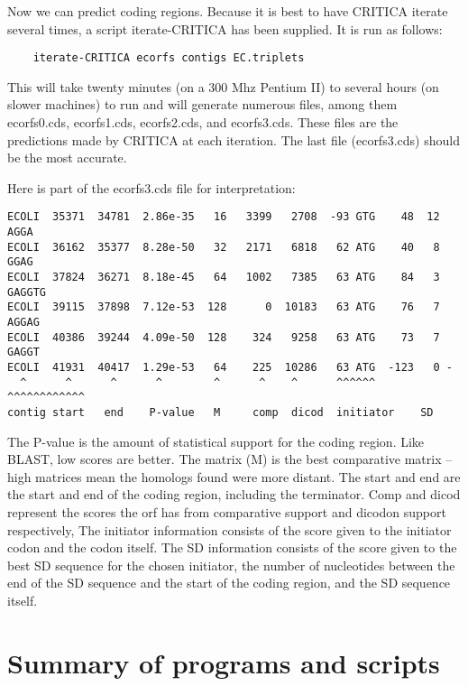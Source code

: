 \documentclass{article}
\begin{document}
Now we can predict coding regions. Because it is best to have CRITICA
iterate several times, a script iterate-CRITICA has been
supplied. It is run as follows:

\begin{verbatim}
	iterate-CRITICA ecorfs contigs EC.triplets
\end{verbatim}

This will take twenty minutes (on a 300 Mhz Pentium II) to several
hours (on slower machines) to run and will generate numerous files,
among them ecorfs0.cds, ecorfs1.cds, ecorfs2.cds,
and ecorfs3.cds. These files are the predictions made by
CRITICA at each iteration.  The last file (ecorfs3.cds) should
be the most accurate.
\begin{samepage}
Here is part of the ecorfs3.cds file for interpretation:

\begin{verbatim}
ECOLI  35371  34781  2.86e-35   16   3399   2708  -93 GTG    48  12 AGGA    
ECOLI  36162  35377  8.28e-50   32   2171   6818   62 ATG    40   8 GGAG    
ECOLI  37824  36271  8.18e-45   64   1002   7385   63 ATG    84   3 GAGGTG  
ECOLI  39115  37898  7.12e-53  128      0  10183   63 ATG    76   7 AGGAG   
ECOLI  40386  39244  4.09e-50  128    324   9258   63 ATG    73   7 GAGGT  
ECOLI  41931  40417  1.29e-53   64    225  10286   63 ATG  -123   0 -  
  ^      ^      ^      ^        ^      ^    ^      ^^^^^^   ^^^^^^^^^^^^
contig start   end    P-value   M     comp  dicod  initiator    SD
\end{verbatim}
\end{samepage}

The P-value is the amount of statistical support for the coding
region. Like BLAST, low scores are better. The matrix (M) is the best
comparative matrix -- high matrices mean the homologs found were more
distant. The start and end are the start and end of the coding region,
including the terminator. Comp and dicod represent the scores the orf
has from comparative support and dicodon support respectively, The
initiator information consists of the score given to the initiator
codon and the codon itself. The SD information consists of the score
given to the best SD sequence for the chosen initiator, the number of
nucleotides between the end of the SD sequence and the start of the
coding region, and the SD sequence itself.


\section{Summary of programs and scripts}
\end{document}
